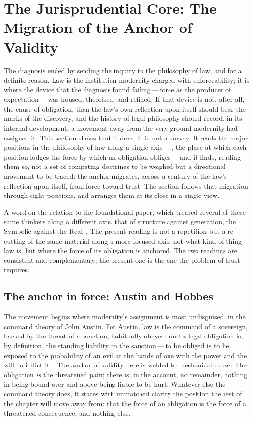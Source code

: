\section{The Jurisprudential Core: The Migration of the Anchor of Validity}
\label{p13:sec:jurisprudence}

\noindent
The diagnosis ended by sending the inquiry to the philosophy of law, and for a definite reason. Law is the institution modernity charged with enforceability; it is where the device that the diagnosis found failing\,---\,force as the producer of expectation\,---\,was housed, theorised, and refined. If that device is not, after all, the cause of obligation, then the law's own reflection upon itself should bear the marks of the discovery, and the history of legal philosophy should record, in its internal development, a movement away from the very ground modernity had assigned it. This section shows that it does. It is not a survey. It reads the major positions in the philosophy of law along a single axis\,---\,, the place at which each position lodges the force by which an obligation obliges\,---\,and it finds, reading them so, not a set of competing doctrines to be weighed but a directional movement to be traced: the anchor migrates, across a century of the law's reflection upon itself, from force toward trust. The section follows that migration through eight positions, and arranges them at its close in a single view.

A word on the relation to the foundational paper, which treated several of these same thinkers along a different axis, that of structure against generation, the Symbolic against the Real~\parencite{wanhong_grb}. The present reading is not a repetition but a re-cutting of the same material along a more focused axis: not what kind of thing law is, but where the force of its obligation is anchored. The two readings are consistent and complementary; the present one is the one the problem of trust requires.

\subsection{The anchor in force: Austin and Hobbes}
\label{p13:sub:jur-austin}

The movement begins where modernity's assignment is most undisguised, in the command theory of John Austin. For Austin, law is the command of a sovereign, backed by the threat of a sanction, habitually obeyed; and a legal obligation is, by definition, the standing liability to the sanction\,---\,to be obliged is to be exposed to the probability of an evil at the hands of one with the power and the will to inflict it~\parencite{austin1832}. The anchor of validity here is welded to mechanical cause. The obligation \emph{is} the threatened pain; there is, in the account, no remainder, nothing in being bound over and above being liable to be hurt. Whatever else the command theory does, it states with unmatched clarity the position the rest of the chapter will move away from: that the force of an obligation is the force of a threatened consequence, and nothing else.

